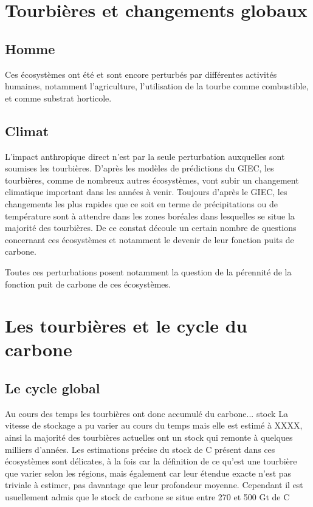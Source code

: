 \section{Tourbières et changements globaux}

\subsection{Homme}
Ces écosystèmes ont été et sont encore perturbés par différentes activités humaines, notamment l'agriculture, l'utilisation de la tourbe comme combustible, et comme substrat horticole.

\subsection{Climat}
L'impact anthropique direct n'est par la seule perturbation auxquelles sont soumises les tourbières.
D'après les modèles de prédictions du GIEC, les tourbières, comme de nombreux autres écosystèmes, vont subir un changement climatique important dans les années à venir.
Toujours d'après le GIEC, les changements les plus rapides que ce soit en terme de précipitations ou de température sont à attendre dans les zones boréales dans lesquelles se situe la majorité des tourbières.
De ce constat découle un certain nombre de questions concernant ces écosystèmes et notamment le devenir de leur fonction puits de carbone.


Toutes ces perturbations posent notamment la question de la pérennité de la fonction puit de carbone de ces écosystèmes.

\section{Les tourbières et le cycle du carbone}

\subsection{Le cycle global}

Au cours des temps les tourbières ont donc accumulé du carbone... stock
La vitesse de stockage a pu varier au cours du temps mais elle est estimé à XXXX, ainsi la majorité des tourbières actuelles ont un stock qui remonte à quelques milliers d'années.
Les estimations précise du stock de C présent dans ces écosystèmes sont délicates, à la fois car la définition de ce qu'est une tourbière que varier selon les régions, mais également car leur étendue exacte n'est pas triviale à estimer, pas davantage que leur profondeur moyenne.
Cependant il est usuellement admis que le stock de carbone se situe entre 270 et 500 Gt de C


